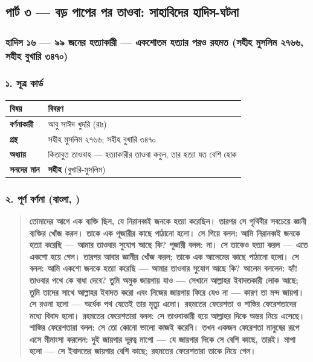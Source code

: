 \subsection*{পার্ট ৩ — বড় পাপের পর তাওবা: সাহাবিদের হাদিস-ঘটনা}

\subsubsection*{হাদিস ১৬ — ৯৯ জনের হত্যাকারী — একশোতম হত্যার পরও রহমত (সহীহ মুসলিম ২৭৬৬, সহীহ বুখারি ৩৪৭০)}

\subsubsection*{১. সূত্র কার্ড}

\begin{table}[h]\centering\small
\begin{tabular}{ll}
বিষয় & বিবরণ \\
\hline
\textbf{বর্ণনাকারী} & আবু সাঈদ খুদরি (রাঃ) \\
\textbf{গ্রন্থ} & সহীহ মুসলিম ২৭৬৬; সহীহ বুখারি ৩৪৭০ \\
\textbf{অধ্যায়} & কিতাবুত তাওবাহ — \lat{“}হত্যাকারীর তাওবা কবুল, তার হত্যা যত বেশি হোক\lat{”} \\
\textbf{সনদের মান} & \textbf{সহীহ} (বুখারি-মুসলিম) \\
\hline
\end{tabular}
\end{table}

\subsubsection*{২. পূর্ণ বর্ণনা (বাংলা, )}

\begin{quote}
\textbf{তোমাদের আগে এক ব্যক্তি ছিল, যে নিরানব্বই জনকে হত্যা করেছিল। তারপর সে পৃথিবীর সবচেয়ে জ্ঞানী ব্যক্তির খোঁজ করল। তাকে এক পূজারীর কাছে পাঠানো হলো। সে গিয়ে বলল: আমি নিরানব্বই জনকে হত্যা করেছি — আমার তাওবার সুযোগ আছে কি? পূজারী বলল: না। সে তাকেও হত্যা করল — এতে একশো হয়ে গেল। তারপর আবার জ্ঞানীর খোঁজ করল; তাকে এক আলেমের কাছে পাঠানো হলো। সে বলল: আমি একশো জনকে হত্যা করেছি — আমার তাওবার সুযোগ আছে কি? আলেম বললেন: হ্যাঁ! তাওবার পথে কে বাধা দেবে? তুমি অমুক জায়গায় যাও — সেখানে আল্লাহর ইবাদতকারী লোক আছে; তুমি তাদের সাথে আল্লাহর ইবাদত করো এবং নিজের জায়গায় ফিরে যেও না — কারণ তা মন্দ জায়গা। সে রওনা হলো — অর্ধেক পথ যেতেই তার মৃত্যু এলো। রহমতের ফেরেশতা ও শাস্তির ফেরেশতাদের মধ্যে বিবাদ হলো। রহমতের ফেরেশতারা বলল: সে তাওবাকারী হয়ে আল্লাহর দিকে অন্তর নিয়ে এসেছে। শাস্তির ফেরেশতারা বলল: সে তো কোনো ভালো কাজই করেনি। তখন একজন ফেরেশতা মানুষের রূপে এসে মীমাংসা করলেন: দুই জায়গার দূরত্ব মাপো — যে জায়গার দিকে সে বেশি কাছে, তারই। মাপা হলো — সে ইবাদতের জায়গার বেশি কাছে; রহমতের ফেরেশতারা তাকে নিয়ে গেল।}
\end{quote}

